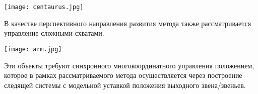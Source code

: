 \begin{center}
  \texttt{[image: centaurus.jpg]}
  \label{}
\end{center}

В качестве перспективного направления развития метода также рассматривается управление сложными схватами.

\begin{center}
  \texttt{[image: arm.jpg]}
  \label{}
\end{center}

Эти объекты требуют синхронного многокоординатного управления положением, которое в рамках рассматриваемого метода осуществляется через построение следящей системы с модельной уставкой положения выходного звена/звеньев.

